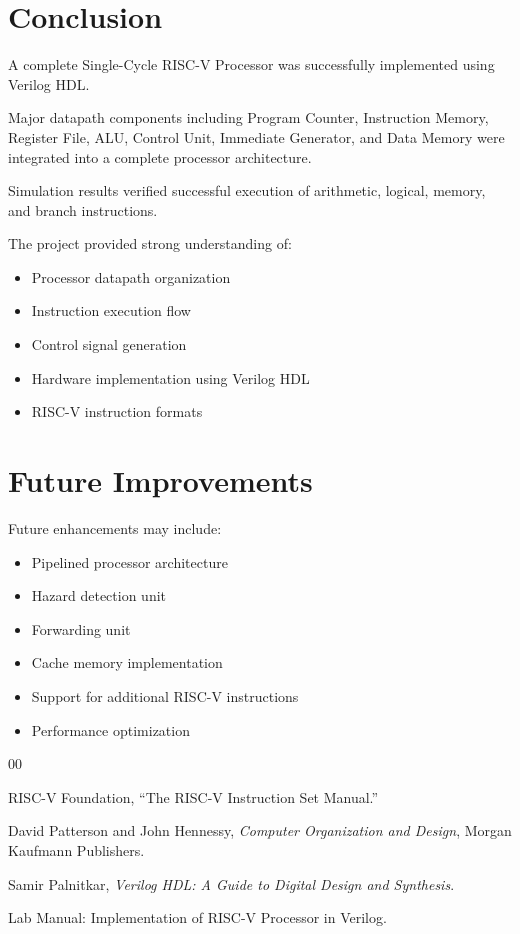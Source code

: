 \documentclass[conference]{IEEEtran}
\begin{document}
\section{Conclusion}

A complete Single-Cycle RISC-V Processor was successfully implemented using Verilog HDL.

Major datapath components including Program Counter, Instruction Memory, Register File, ALU, Control Unit, Immediate Generator, and Data Memory were integrated into a complete processor architecture.

Simulation results verified successful execution of arithmetic, logical, memory, and branch instructions.

The project provided strong understanding of:

\begin{itemize}
    \item Processor datapath organization
    \item Instruction execution flow
    \item Control signal generation
    \item Hardware implementation using Verilog HDL
    \item RISC-V instruction formats
\end{itemize}


\section{Future Improvements}

Future enhancements may include:

\begin{itemize}
    \item Pipelined processor architecture
    \item Hazard detection unit
    \item Forwarding unit
    \item Cache memory implementation
    \item Support for additional RISC-V instructions
    \item Performance optimization
\end{itemize}


\begin{thebibliography}{00}

 RISC-V Foundation, ``The RISC-V Instruction Set Manual.''

 David Patterson and John Hennessy, \textit{Computer Organization and Design}, Morgan Kaufmann Publishers.

 Samir Palnitkar, \textit{Verilog HDL: A Guide to Digital Design and Synthesis}.

 Lab Manual: Implementation of RISC-V Processor in Verilog.

\end{thebibliography}
\end{document}
